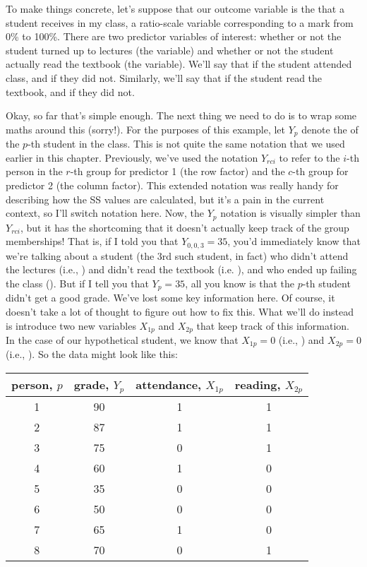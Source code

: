 
To make things concrete, let's suppose that our outcome variable is the  that a student receives in my class, a ratio-scale variable corresponding to a mark from 0\% to 100\%. There are two predictor variables of interest: whether or not the student turned up to lectures (the  variable) and whether or not the student actually read the textbook (the  variable). We'll say that  if the student attended class, and  if they did not. Similarly, we'll say that  if the student read the textbook, and  if they did not. 

Okay, so far that's simple enough. The next thing we need to do is to wrap some maths around this (sorry!). For the purposes of this example, let $Y_p$ denote the  of the $p$-th student in the class. This is not quite the same notation that we used earlier in this chapter. Previously, we've used the notation $Y_{rci}$ to refer to the $i$-th person in the $r$-th group for predictor 1 (the row factor) and the $c$-th group for predictor 2 (the column factor). This extended notation was really handy for describing how the SS values are calculated, but it's a pain in the current context, so I'll switch notation here. Now, the $Y_p$ notation is visually simpler than $Y_{rci}$, but it has the shortcoming that it doesn't actually keep track of the group memberships! That is, if I told you that $Y_{0,0,3} = 35$, you'd immediately know that we're talking about a student (the 3rd such student, in fact) who didn't attend the lectures (i.e., ) and didn't read the textbook (i.e. ), and who ended up failing the class (). But if I tell you that $Y_p = 35$, all you know is that the $p$-th student didn't get a good grade. We've lost some key information here. Of course, it doesn't take a lot of thought to figure out how to fix this. What we'll do instead is introduce two new variables $X_{1p}$ and $X_{2p}$ that keep track of this information. In the case of our hypothetical student, we know that $X_{1p} = 0$ (i.e., ) and $X_{2p} = 0$ (i.e., ). So the data might look like this:

\begin{center}
\begin{tabular}{c|c|c|c}
person, $p$ & grade, $Y_p$ & attendance, $X_{1p}$ & reading, $X_{2p}$ \\ \hline
1 &  90  &  1  & 1 \\  
2 &	 87  &  1  & 1 \\ 
3 &  75  &  0  & 1 \\ 
4 &	 60  &  1  & 0 \\
5 &  35  &  0  & 0 \\
6 &  50  &  0  & 0 \\
7 &  65  &  1  & 0 \\
8 &  70  &  0  & 1 
\end{tabular}
\end{center}

